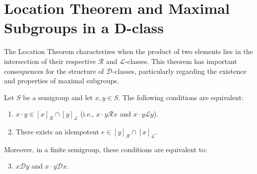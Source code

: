 \chapter{Location Theorem and Maximal Subgroups in a D-class}


The Location Theorem characterizes when the product of two elements lies in the intersection of their respective $\mathcal{R}$ and $\mathcal{L}$-classes. This theorem has important consequences for the structure of $\mathcal{D}$-classes, particularly regarding the existence and properties of maximal subgroups.

\begin{lemma}
\label{lem:location-theorem}
Let $S$ be a semigroup and let $x, y \in S$. The following conditions are equivalent:
\begin{enumerate}
    \item $x \cdot y \in [x]_{\mathcal{R}} \cap [y]_{\mathcal{L}}$ (i.e., $x \cdot y \mathcal{R} x$ and $x \cdot y \mathcal{L} y$).
    \item There exists an idempotent $e \in [y]_{\mathcal{R}} \cap [x]_{\mathcal{L}}$.
\end{enumerate}
Moreover, in a finite semigroup, these conditions are equivalent to:
\begin{enumerate}
    \setcounter{enumi}{2}
    \item $x \mathcal{D} y$ and $x \cdot y \mathcal{D} x$.
\end{enumerate}
\leanok
{}
\end{lemma}

